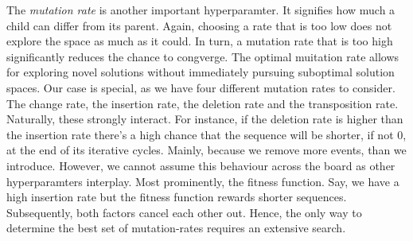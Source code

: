 \documentclass[./../../paper.tex]{subfiles}
\begin{document}
The \emph{mutation rate} is another important hyperparamter. It signifies how much a child can differ from its parent. Again, choosing a rate that is too low does not explore the space as much as it could. In turn, a mutation rate that is too high significantly reduces the chance to congverge. The optimal muitation rate allows for exploring novel solutions without immediately pursuing suboptimal solution spaces. Our case is special, as we have four different mutation rates to consider. The change rate, the insertion rate, the deletion rate and the transposition rate. Naturally, these strongly interact. For instance, if the deletion rate is higher than the insertion rate there's a high chance that the sequence will be shorter, if not 0, at the end of its iterative cycles. Mainly, because we remove more events, than we introduce. However, we cannot assume this behaviour across the board as other hyperparamters interplay. Most prominently, the fitness function. Say, we have a high insertion rate but the fitness function rewards shorter sequences. Subsequently, both factors cancel each other out. Hence, the only way to determine the best set of mutation-rates requires an extensive search.

\end{document}
